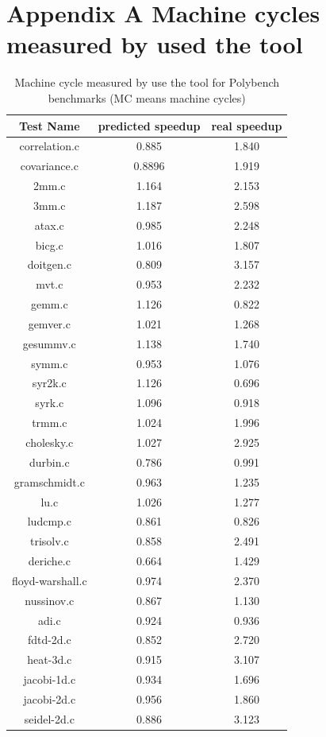 \begin{table}
\section{\fontsize{12}{15}\selectfont Appendix A Machine cycles measured by used the tool}
\begin{center}
\caption{Machine cycle measured by use the tool for Polybench benchmarks (MC means machine cycles)}
\vspace{0.2cm}
\begin{tabular}{ |c|c|c| } 
 \hline
Test Name & predicted speedup & real speedup \\
 \hline
 correlation.c & 0.885 & 1.840 \\
 \hline
  covariance.c & 0.8896 & 1.919 \\
 \hline
  2mm.c & 1.164 & 2.153 \\
 \hline
  3mm.c & 1.187 & 2.598 \\
 \hline
  atax.c & 0.985 & 2.248 \\
 \hline
  bicg.c & 1.016 & 1.807 \\
 \hline
  doitgen.c & 0.809 & 3.157 \\
 \hline
  mvt.c & 0.953 & 2.232 \\
 \hline
  gemm.c & 1.126 & 0.822\\
 \hline
  gemver.c & 1.021 & 1.268 \\
 \hline
  gesummv.c & 1.138 & 1.740 \\
 \hline
  symm.c & 0.953 & 1.076 \\
 \hline
  syr2k.c & 1.126 & 0.696 \\
 \hline
  syrk.c & 1.096 & 0.918 \\
 \hline
  trmm.c & 1.024 & 1.996 \\
 \hline
  cholesky.c & 1.027 & 2.925 \\
 \hline
  durbin.c & 0.786 & 0.991 \\
 \hline
  gramschmidt.c & 0.963 & 1.235 \\
 \hline
  lu.c & 1.026 & 1.277 \\
 \hline
  ludcmp.c & 0.861 & 0.826 \\
 \hline
  trisolv.c & 0.858 & 2.491 \\
 \hline
  deriche.c & 0.664 & 1.429 \\
 \hline
  floyd-warshall.c & 0.974 & 2.370 \\
 \hline
  nussinov.c & 0.867 & 1.130 \\
 \hline
  adi.c & 0.924 & 0.936 \\
 \hline
  fdtd-2d.c & 0.852 & 2.720 \\
 \hline
  heat-3d.c & 0.915 & 3.107 \\
 \hline
  jacobi-1d.c & 0.934 & 1.696 \\
 \hline
  jacobi-2d.c & 0.956 & 1.860 \\
 \hline
  seidel-2d.c & 0.886 & 3.123 \\
 \hline
\end{tabular}
\end{center}
\end{table}

